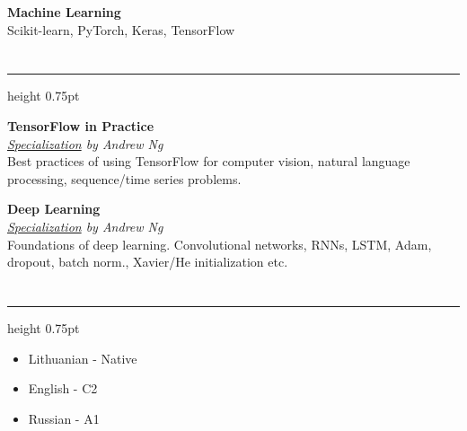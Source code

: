 \documentclass[fontsize=10pt]{article}
\let\oldsection\section
\renewcommand\section[1]{%
	\vspace{0.75\baselineskip}
    \oldsection{\color{Brown}{#1}}%
	\vspace{-0.5\baselineskip}
    \hrule height 0.75pt
    \vspace{0.75\baselineskip}
}
\begin{document}
\textbf{Machine Learning}\\
Scikit-learn, PyTorch, Keras, TensorFlow


\section{Online Education}
 
 
{\large\textbf{TensorFlow in Practice}}\\
\textit{
	\href{https://www.deeplearning.ai/courses/tensorflow-developer-professional-certificate/}{Specialization} by Andrew Ng
}\\[5pt]
Best practices of using TensorFlow for computer vision, natural language processing,  sequence/time series problems.
\vspace*{0.5\baselineskip}

{\large\textbf{Deep Learning}}\\
\textit{
	\href{https://www.deeplearning.ai/courses/deep-learning-specialization/}{Specialization} by Andrew Ng
}\\[5pt]
Foundations of deep learning. Convolutional networks, RNNs, LSTM, Adam, dropout, batch norm., Xavier/He initialization etc.

\section{Communication skills}

\begin{itemize}
	\item Lithuanian - Native
	\item English - C2
	\item Russian - A1
\end{itemize}
\end{document}

